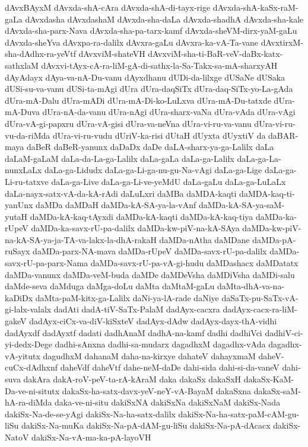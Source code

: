 {dAvxBAyxM
dAvxda-shA-cAra
dAvxda-shA-di-tayx-rige
dAvxda-shA-kaSx-raM-gaLa
dAvxdasha
dAvxdashaM
dAvxda-sha-daLa
dAvxda-shadhA
dAvxda-sha-kale
dAvxda-sha-parx-Nava
dAvxda-sha-pa-tarx-kamf
dAvxda-sheVM-dirx-yaM-gaLu
dAvxda-sheYva
dAvxpa-ra-dalilx
dAvxra-gaLu
dAvxra-ka-vA-Ta-vane
dAvxtirxM-sha-dAdhx-ra-yeVtf
dAvxviM-shateVH
dAvxviM-sha-ti-BaR-veV-daBx-katx-sathxlaM
dAvxvi-tAyx-cA-ra-liM-gA-di-sathx-la-Sa-Takx-sa-mA-sharxyAH
dAyAdayx
dAya-va-nA-Du-vanu
dAyxdhanu
dUDi-da-lilxge
dUSaNe
dUSaka
dUSi-su-va-vanu
dUSi-ta-mAgi
dUra
dUra-daqSiTx
dUra-daq-SiTx-yo-La-gAda
dUra-mA-Dalu
dUra-mADi
dUra-mA-Di-ko-LuLxva
dUra-mA-Du-tatxde
dUra-mA-Duva
dUra-nA-da-vanu
dUra-nAgi
dUra-sharx-vaNa
dUra-vAda
dUra-vAgi
dUra-vA-gi-papxru
dUra-vA-gisi
dUra-va-neVna
dUra-vi-ru-va-vanu
dUra-vi-ru-vu-da-riMda
dUra-vi-ru-vudu
dUriV-ka-risi
dUtaH
dUyxta
dUyxtiV
da
daBAR-maya
daBeR
daBeR-yanunx
daDaDx
daDe
daLA-sharx-ya-ga-Lalilx
daLa
daLaM-gaLaM
daLa-da-La-ga-Lalilx
daLa-gaLa
daLa-ga-Lalilx
daLa-ga-La-nunxLaLx
daLa-ga-Lidudx
daLa-ga-Li-ga-nu-gu-Na-vAgi
daLa-ga-Lige
daLa-ga-Li-ru-tatxve
daLa-ga-Live
daLa-ga-Li-ve-yeMdU
daLa-gaLu
daLa-ga-LuLaLx
daLa-nayx-satx-vA-da-kA-rAdi
daLuLxri
daMBa
daMDA-kaqti
daMDA-kaq-ti-yanUnx
daMDa
daMDaH
daMDa-kA-SA-ya-la-vAnf
daMDa-kA-SA-ya-saM-yutaH
daMDa-kA-kaq-tAyxdi
daMDa-kA-kaqti
daMDa-kA-kaq-tiya
daMDa-ka-rUpeV
daMDa-ka-savx-rU-pa-dalilx
daMDa-kw-piV-na-kA-SAya
daMDa-kw-piV-na-kA-SA-ya-ja-TA-va-lakx-la-dhA-rakaH
daMDa-nAtha
daMDane
daMDa-pA-ruSayx
daMDa-parx-NA-mava
daMDa-rUpeV
daMDa-savx-rU-pa-dalilx
daMDa-savx-rU-pa-parx-Nama
daMDa-savx-rU-pa-vA-gi-hudu
daMDashacx
daMDatatx
daMDa-vanunx
daMDa-veM-buda
daMDe
daMDeVsha
daMDiVsha
daMDi-salu
daMde-seva
daMduga
daMga-doLu
daMta
daMtaM-gaLu
daMta-dhA-va-na-kaDiDx
daMta-paM-kitx-ga-Lalilx
daNi-ya-lA-rade
daNiye
daSaTx-pu-SaTx-vA-gi-lalx-valalx
dadAti
dadA-tiV-SaTx-PalaM
dadAyx-cacxra
dadAyx-cacx-ra-liM-gakeV
dadAyx-ciCx-va-diV-kiSxteV
dadAyx-dAdw
dadAyx-dayx-thA-vidhi
dadAyxdf
dadAyxtf
dadati
dadhAnaM
dadhA-na-kamf
dadhi
dadhiVci
dadhiV-ci-yi-dedx-Dege
dadhi-sAnxna
dadhi-sa-mudarx
dagadhxM
dagadhx-vAda
dagadhx-vA-yitutx
dagudhxM
dahanaM
daha-na-kirxye
dahateV
dahayxmaM
daheV-cuCx-dAdhxnf
daheVdf
daheVtf
dahe-neM-daDe
dahi-sida
dahi-si-da-vaneV
dahi-suva
dakAra
dakA-roV-peV-ta-rA-kAraM
daka
dakaSx
dakaSxH
dakaSx-KaM-Da-ve-ni-situtx
dakaSx-ha-satx-davx-yeV-neY-vA-BayaM
dakaSxna
dakaSx-saM-hA-ra-diMda
daka-ve-ni-situ
dakiSxNA
dakiSxNa
dakiSxNaM
dakiSx-Nada
dakiSx-Na-de-se-yAgi
dakiSx-Na-ha-satx-dalilx
dakiSx-Na-ha-satx-paM-cAM-gu-liSu
dakiSx-Na-muKa
dakiSx-Na-pA-dAM-gu-liSu
dakiSx-Na-pA-dAcacx
dakiSx-NatoV
dakiSx-Na-vA-ma-ka-pA-layoVH
}
